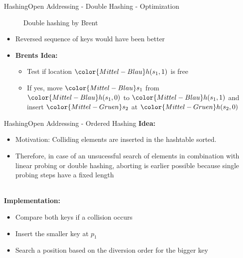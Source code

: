 
\begin{frame}{Hashing}{Open Addressing - Double Hashing - Optimization}
  \vspace{-2.0em}
  \begin{figure}[!h]
    \begin{adjustbox}{width=0.9\linewidth}%
    \end{adjustbox}
    \vspace{-1.0em}
    \caption{Double hashing by Brent}%
    \label{fig:hashing:open_addressing:double_hashing_brent}%
  \end{figure}
  \vspace{-1.0em}
  \begin{itemize}
  \item<4->
    Reversed sequence of keys would have been better
  \item<5->
    \textbf{Brents Idea:}
    \begin{itemize}
    \item<6->
      Test if location ${\color{Mittel-Blau}h(s_1, 1)}$ is free
    \item<7->
      If yes, move ${\color{Mittel-Blau}s_1}$ from
      ${\color{Mittel-Blau}h(s_1, 0)}$ to ${\color{Mittel-Blau}h(s_1, 1)}$
      and insert ${\color{Mittel-Gruen}s_2}$ at
      ${\color{Mittel-Gruen}h(s_2, 0)}$
    \end{itemize}
  \end{itemize}  
\end{frame}


\begin{frame}{Hashing}{Open Addressing - Ordered Hashing}
  \textbf{ Idea:}
  \begin{itemize}
    \item Motivation:
      Colliding elements are inserted in the hashtable sorted. 
    \item
      Therefore, in case of an unsucessful search of elements
      in combination with linear probing or double hashing,
      aborting is earlier possible because single probing steps
      have a fixed length
  \end{itemize}
  \hfill\\[0.5em]
  \textbf{Implementation:}
  \begin{itemize}
    \item
      Compare both keys if a collision occurs
    \item
      Insert the smaller key at $p_1$
    \item
      Search a position based on the diversion order for the bigger key
  \end{itemize}
\end{frame}

